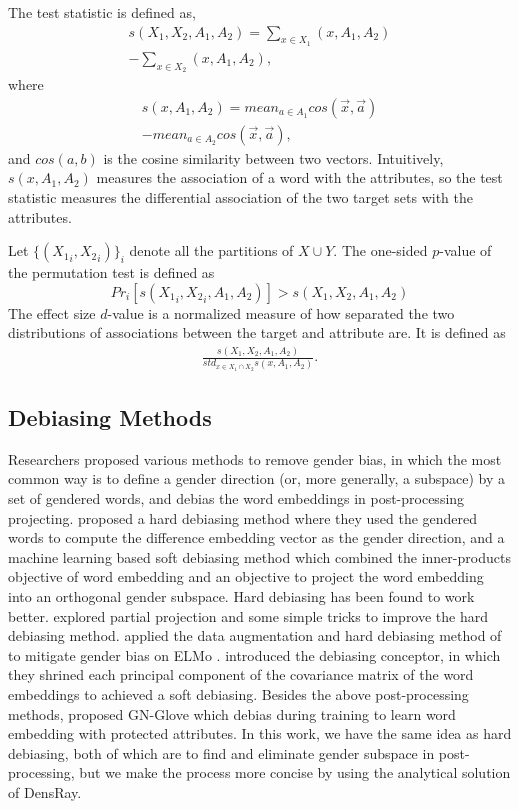 The test statistic is defined as,
\begin{eqnarray}
s(X_1,X_2,A_1,A_2)=\sum_{x\in X_1}(x,A_1,A_2)\nonumber\\
-\sum_{x\in X_2}(x,A_1,A_2),\nonumber
\end{eqnarray}
where
\begin{eqnarray}
s(x,A_1,A_2)=mean_{a\in A_1}cos(\vec{x},\vec{a})\nonumber\\
-mean_{a\in A_2}cos(\vec{x},\vec{a}),\nonumber
\end{eqnarray}
and $cos(a, b)$ is the cosine similarity between two vectors.
Intuitively, $s(x,A_1,A_2)$ measures the association of a word with the attributes, so the test statistic measures the differential association of the two target sets with the attributes. 

Let $\{({X_1}_i,{X_2}_i)\}_{i}$ denote all the partitions of $X\cup Y$. The one-sided $p$-value of the permutation test is defined as $$Pr_i[s({X_1}_i,{X_2}_i,A_1,A_2)]>s(X_1,X_2,A_1,A_2)$$
The effect size $d$-value is a normalized measure of how separated the two distributions of associations between the target and attribute are. It is defined as
\begin{eqnarray}
\frac{s(X_1,X_2,A_1,A_2)}{std_{x\in X_1 \cap X_2}s(x,A_1,A_2)}.\nonumber
\end{eqnarray}

\subsection{Debiasing Methods}
Researchers proposed various methods to remove gender bias, in which the most common way is to define a gender direction (or, more generally, a subspace) by a set of gendered words, and debias the word embeddings in post-processing projecting. \citet{bolukbasi2016man} proposed a hard debiasing method where they used the gendered words to compute the difference embedding vector as the gender direction, and a machine learning based soft debiasing method which combined the inner-products objective of word embedding and an objective to project the word embedding into an orthogonal gender subspace. Hard debiasing has been found to work better. \citet{dev2019attenuating} explored partial projection and some simple tricks to improve the hard debiasing method. \citet{zhao2019gender} applied the data augmentation and hard debiasing method of \citet{bolukbasi2016man} to mitigate gender bias on ELMo \citep{Peters:2018}. \citet{karve2019conceptor} introduced the debiasing conceptor, in which they shrined each principal component of the covariance matrix of the word embeddings to achieved a soft debiasing. Besides the above post-processing methods, \citep{zhao2018learning} proposed GN-Glove which debias during training to learn word embedding with protected attributes. In this work, we have the same idea as hard debiasing, both of which are to find and eliminate gender subspace in post-processing, but we make the process more concise by using the analytical solution of DensRay.

